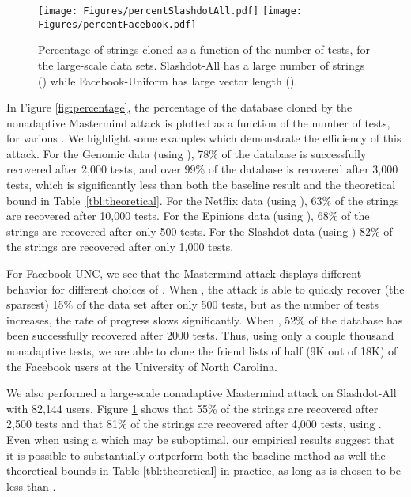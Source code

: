 \documentclass{article}
\begin{document}
\begin{figure}
\centering
\texttt{[image: Figures/percentSlashdotAll.pdf]} \qquad
\texttt{[image: Figures/percentFacebook.pdf]}
\caption{Percentage of strings cloned as a function of the number of tests, for the large-scale
data sets.  Slashdot-All has a large number of strings
() while Facebook-Uniform has large vector length (). }
\label{fig:percentageLargeScale}
\end{figure}


In Figure \ref{fig:percentage}, the percentage of the database cloned by the
nonadaptive Mastermind attack is plotted as a function of the number of tests, 
for various .  We highlight some examples which demonstrate the 
efficiency of this attack.  For the Genomic data (using 
), 78\% of the database is successfully recovered 
after 2,000 tests, and over 99\% of the database is recovered after 3,000 tests, which
is significantly less than both the baseline result and the theoretical bound in 
Table~\ref{tbl:theoretical}.
For the Netflix data (using ), 63\% of the strings 
are recovered after 10,000 tests.  For the Epinions data (using ), 
68\% of the strings are recovered after only 500 tests.  For the Slashdot data 
(using ) 82\% of the strings are recovered after 
only 1,000 tests.

For Facebook-UNC, we see that the Mastermind 
attack displays different behavior for different choices of .  When , the attack is able to 
quickly recover (the sparsest) 15\% of the data set after only 500 tests, but as the number of tests increases, 
the rate of progress slows significantly.  When , 52\% of the database has been successfully recovered 
after 2000 tests.  Thus, using only a couple thousand nonadaptive tests, we are able to 
clone the friend lists of half (9K out of 18K) of the Facebook users at the University of 
North Carolina.  

We also performed a large-scale nonadaptive Mastermind attack on Slashdot-All with 82,144 users.  
Figure \ref{fig:percentageLargeScale} shows that 
55\% of the strings are recovered after 2,500 
tests and that 81\% of the strings are recovered after 4,000 tests, using .
Even when using a  which may be suboptimal, our empirical results suggest that it 
is possible to substantially outperform both the baseline method as well the theoretical 
bounds in Table \ref{tbl:theoretical} in practice, as long as  is chosen to be less than .
\end{document}
